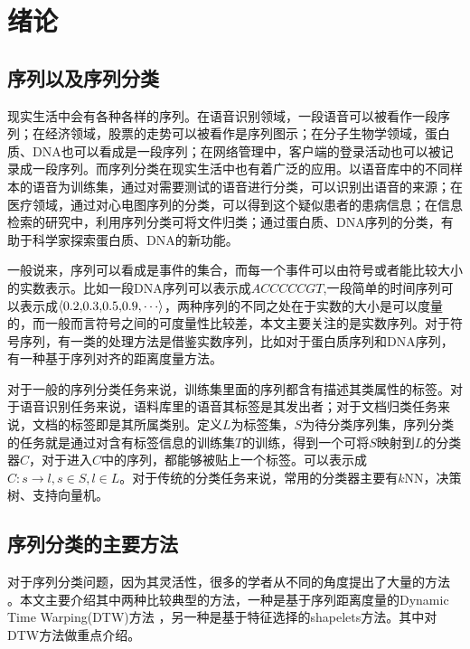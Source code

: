 \chapter{绪论}
\section{序列以及序列分类}
现实生活中会有各种各样的序列。在语音识别领域，一段语音可以被看作一段序列；在经济领域，股票的走势可以被看作是序列图示；在分子生物学领域，蛋白质、DNA也可以看成是一段序列；在网络管理中，客户端的登录活动也可以被记录成一段序列。而序列分类在现实生活中也有着广泛的应用。以语音库中的不同样本的语音为训练集，通过对需要测试的语音进行分类，可以识别出语音的来源；在医疗领域，通过对心电图序列的分类，可以得到这个疑似患者的患病信息；在信息检索的研究中，利用序列分类可将文件归类；通过蛋白质、DNA序列的分类，有助于科学家探索蛋白质、DNA的新功能\cite{Xing2010}。

一般说来，序列可以看成是事件的集合，而每一个事件可以由符号或者能比较大小的实数表示。比如一段DNA序列可以表示成$ACCCCCGT$,一段简单的时间序列可以表示成$\left\langle {0.2{\rm{,}}0.3{\rm{,}}0.5{\rm{,}}0.9{\rm{,}} \cdots } \right\rangle $，两种序列的不同之处在于实数的大小是可以度量的，而一般而言符号之间的可度量性比较差，本文主要关注的是实数序列。对于符号序列，有一类的处理方法是借鉴实数序列，比如对于蛋白质序列和DNA序列，有一种基于序列对齐的距离度量方法\cite{kajan2006application}。

对于一般的序列分类任务来说，训练集里面的序列都含有描述其类属性的标签。对于语音识别任务来说，语料库里的语音其标签是其发出者；对于文档归类任务来说，文档的标签即是其所属类别。定义$L$为标签集，$S$为待分类序列集，序列分类的任务就是通过对含有标签信息的训练集$T$的训练，得到一个可将$S$映射到$L$的分类器$C$，对于进入$C$中的序列，都能够被贴上一个标签。可以表示成$C:s \to l,s \in S,l \in L$。对于传统的分类任务来说，常用的分类器主要有$k$NN，决策树、支持向量机\cite{Wu2008}。

\section{序列分类的主要方法}
对于序列分类问题，因为其灵活性，很多的学者从不同的角度提出了大量的方法\cite{Al-Naymat2009}\cite{Keogh2000}\cite{Salvador2007}
\cite{Thrun2000}\cite{Xi2006}\cite{Ye2009}。本文主要介绍其中两种比较典型的方法，一种是基于序列距离度量的Dynamic Time Warping(DTW)方法\cite{Al-Naymat2009}\cite{Batista2011}\cite{Keogh2000}\cite{LESLIE2001}\cite{Lin2007}\cite{Salvador2007}
\cite{Xi2006}，另一种是基于特征选择的shapelets方法\cite{Ye2009}。其中对DTW方法做重点介绍。

